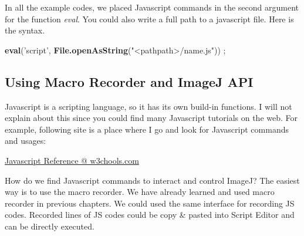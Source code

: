 \documentclass[11pt,a4paper,oneside]{report}
\newenvironment{indentCom}%
{\begin{list}{}%
         {\setlength{\leftmargin}{1em}}%
         \item[]%
}
{\end{list}}
\begin{document}
In all the example codes, we placed Javascript commands in the second argument for the function \textit{eval}. You could also write a full path to a javascript file. Here is the syntax. 
\begin{shaded}
\begin{indentCom}
\item \textbf{eval}('script', \textbf{File.openAsString}("<pathpath>/name.js")) ;
\end{indentCom}
\end{shaded}

\subsection{Using Macro Recorder and ImageJ API}
Javascript is a scripting language, so it has its own build-in functions. I will not explain about this since you could find many Javascript tutorials on the web. For example, following site is a place where I go and look for Javascript commands and usages:

\href{http://www.w3schools.com/jsref/default.asp}{Javascript Reference @ w3chools.com}

How do we find Javascript commands to interact and control ImageJ? The easiest way is to use the macro recorder. We have already learned and used macro recorder in previous chapters. We could used the same interface for recording JS codes. Recorded lines of JS codes could be copy \& pasted into Script Editor and can be directly executed. 
\end{document}
